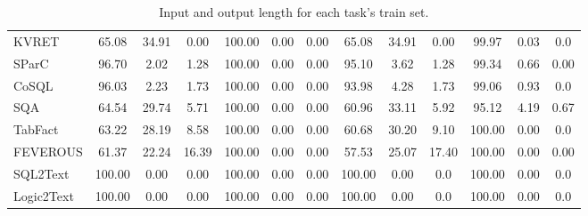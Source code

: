 \documentclass[11pt]{article}
\begin{document}
\begin{table*}[ht]
\begin{adjustbox}{width=\textwidth}
\begin{tabular}{@{}lcccccccccccc@{}}
    KVRET  & 65.08 & 34.91 & 0.00 & 100.00 & 0.00 & 0.00 & 65.08 & 34.91 & 0.00 & 99.97 & 0.03 & 0.0\\
    SParC & 96.70 & 2.02 & 1.28 & 100.00 & 0.00 & 0.00 & 95.10 & 3.62 & 1.28 & 99.34 & 0.66 & 0.00 \\
    CoSQL  & 96.03 & 2.23 & 1.73 & 100.00 & 0.00 & 0.00 & 93.98 & 4.28 & 1.73 & 99.06 & 0.93 & 0.0\\
    SQA  & 64.54 & 29.74 & 5.71 & 100.00 & 0.00 & 0.00 & 60.96 & 33.11 & 5.92& 95.12 & 4.19 & 0.67\\
    TabFact  & 63.22 & 28.19 & 8.58 & 100.00 & 0.00 & 0.00 & 60.68 & 30.20 & 9.10 & 100.00 & 0.00 & 0.0\\
    FEVEROUS  & 61.37 & 22.24 & 16.39 & 100.00 & 0.00 & 0.00 & 57.53 & 25.07 & 17.40 & 100.00 & 0.00 & 0.00 \\
    SQL2Text & 100.00 & 0.00 & 0.00 & 100.00 & 0.00 & 0.00 & 100.00 & 0.00 & 0.0& 100.00 & 0.00 & 0.0\\
    Logic2Text & 100.00 & 0.00 & 0.00 & 100.00 & 0.00 & 0.00 & 100.00 & 0.00 & 0.0& 100.00 & 0.00 & 0.0\\
    \bottomrule
    \end{tabular}
    \end{adjustbox}
	\caption{Input and output length for each task's train set.}
	\label{tab:length_distribution}
\end{table*}
\end{document}
